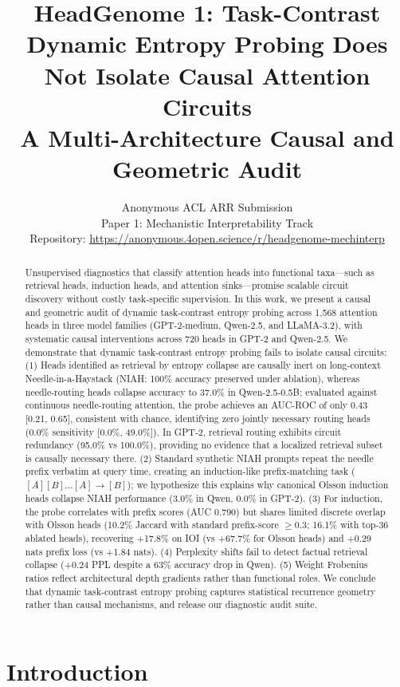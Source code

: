 \documentclass[11pt]{article}
\title{HeadGenome 1: Task-Contrast Dynamic Entropy Probing Does Not Isolate Causal Attention Circuits\\A Multi-Architecture Causal and Geometric Audit}
\author{Anonymous ACL ARR Submission \\
  Paper 1: Mechanistic Interpretability Track \\
  Repository: \url{https://anonymous.4open.science/r/headgenome-mechinterp} \\
}
\begin{document}
\maketitle

\begin{abstract}
Unsupervised diagnostics that classify attention heads into functional taxa---such as retrieval heads, induction heads, and attention sinks---promise scalable circuit discovery without costly task-specific supervision. In this work, we present a causal and geometric audit of dynamic task-contrast entropy probing across 1,568 attention heads in three model families (GPT-2-medium, Qwen-2.5, and LLaMA-3.2), with systematic causal interventions across 720 heads in GPT-2 and Qwen-2.5. We demonstrate that dynamic task-contrast entropy probing fails to isolate causal circuits: (1) Heads identified as retrieval by entropy collapse are causally inert on long-context Needle-in-a-Haystack (NIAH: 100\% accuracy preserved under ablation), whereas needle-routing heads collapse accuracy to 37.0\% in Qwen-2.5-0.5B; evaluated against continuous needle-routing attention, the probe achieves an AUC-ROC of only 0.43 [0.21, 0.65], consistent with chance, identifying zero jointly necessary routing heads (0.0\% sensitivity [0.0\%, 49.0\%]). In GPT-2, retrieval routing exhibits circuit redundancy (95.0\% vs 100.0\%), providing no evidence that a localized retrieval subset is causally necessary there. (2) Standard synthetic NIAH prompts repeat the needle prefix verbatim at query time, creating an induction-like prefix-matching task ($[A][B] \dots [A] \to [B]$); we hypothesize this explains why canonical Olsson induction heads collapse NIAH performance (3.0\% in Qwen, 0.0\% in GPT-2). (3) For induction, the probe correlates with prefix scores (AUC 0.790) but shares limited discrete overlap with Olsson heads (10.2\% Jaccard with standard prefix-score $\ge 0.3$; 16.1\% with top-36 ablated heads), recovering +17.8\% on IOI (vs +67.7\% for Olsson heads) and +0.29 nats prefix loss (vs +1.84 nats). (4) Perplexity shifts fail to detect factual retrieval collapse (+0.24 PPL despite a 63\% accuracy drop in Qwen). (5) Weight Frobenius ratios reflect architectural depth gradients rather than functional roles. We conclude that dynamic task-contrast entropy probing captures statistical recurrence geometry rather than causal mechanisms, and release our diagnostic audit suite.
\end{abstract}

\section{Introduction}
\label{sec:intro}
\end{document}
